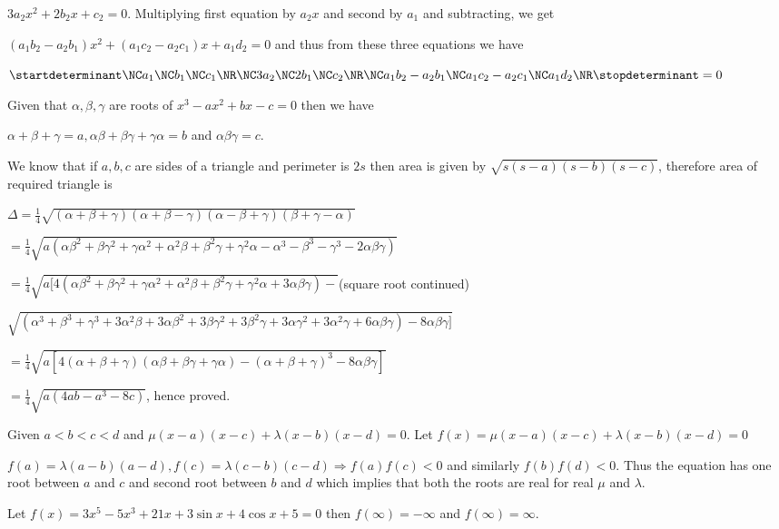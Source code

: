   $3a_2x^2 + 2b_2x + c_2 = 0$. Multiplying first equation by $a_2x$ and second by $a_1$ and subtracting, we
  get

  $(a_1b_2 - a_2b_1)x^2 + (a_1c_2 - a_2c_1)x + a_1d_2 = 0$ and thus from these three equations we have

  $\startdeterminant\NC a_1 \NC b_1\NC c_1\NR\NC 3a_2 \NC 2b_1\NC c_2\NR\NC a_1b_2 - a_2b_1\NC a_1c_2 -
  a_2c_1\NC a_1d_2\NR\stopdeterminant = 0$
\item Given that $\alpha, \beta, \gamma$ are roots of $x^3 - ax^2 + bx - c = 0$ then we have

  $\alpha + \beta + \gamma = a, \alpha\beta + \beta\gamma + \gamma\alpha = b$ and $\alpha\beta\gamma = c$.

  We know that if $a, b, c$ are sides of a triangle and perimeter is $2s$ then area is given by $\sqrt{s(s -
    a)(s - b)(s - c)}$, therefore area of required triangle is

  $\Delta = \frac{1}{4}\sqrt{(\alpha + \beta + \gamma)(\alpha + \beta - \gamma)(\alpha - \beta + \gamma)(\beta +
    \gamma - \alpha )}$

  $= \frac{1}{4}\sqrt{a(\alpha\beta^2 + \beta\gamma^2 + \gamma\alpha^2 + \alpha^2\beta + \beta^2\gamma +
    \gamma^2\alpha - \alpha^3 - \beta^3 - \gamma^3 - 2\alpha\beta\gamma)}$

  $= \frac{1}{4}\sqrt{a[4(\alpha\beta^2 + \beta\gamma^2 + \gamma\alpha^2 + \alpha^2\beta + \beta^2\gamma +
      \gamma^2\alpha + 3\alpha\beta\gamma) - }$(square root continued)

    $\sqrt{(\alpha^3 + \beta^3 + \gamma^3 + 3\alpha^2\beta + 3\alpha\beta^2
    + 3\beta\gamma^2 + 3\beta^2\gamma + 3\alpha\gamma^2 + 3\alpha^2\gamma + 6\alpha\beta\gamma) -
    8\alpha\beta\gamma]}$

  $= \frac{1}{4}\sqrt{a[4(\alpha + \beta + \gamma)(\alpha\beta + \beta\gamma + \gamma\alpha) - (\alpha +
      \beta + \gamma)^3 - 8\alpha\beta\gamma]}$

  $= \frac{1}{4}\sqrt{a(4ab - a^3 - 8c)}$, hence proved.
\item Given $a < b < c < d$ and $\mu(x - a)(x - c) + \lambda(x - b)(x - d) = 0$. Let $f(x) = \mu(x - a)(x -
  c) + \lambda(x - b)(x - d) = 0$

  $f(a) = \lambda(a - b)(a - d), f(c) = \lambda(c - b)(c - d)\Rightarrow f(a)f(c) < 0$ and similarly
  $f(b)f(d) < 0$. Thus the equation has one root between $a$ and $c$ and second root between $b$ and $d$
  which implies that both the roots are real for real $\mu$ and $\lambda$.
\item Let $f(x) = 3x^5 - 5x^3 + 21x + 3\sin x + 4\cos x + 5 = 0$ then $f(\infty) = -\infty$ and $f(\infty) =
  \infty$.

